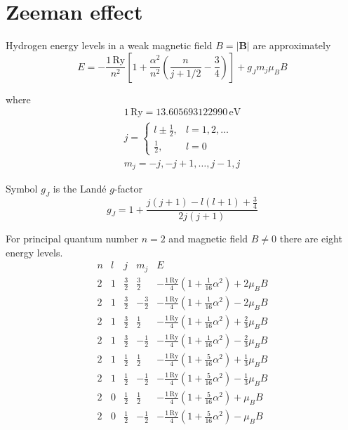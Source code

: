 

\section*{Zeeman effect}

Hydrogen energy levels in a weak magnetic field $B=|\mathbf B|$ are approximately
\begin{equation*}
E=-\frac{1\,\text{Ry}}{n^2}
\left[
1+\frac{\alpha^2}{n^2}\left(\frac{n}{j+1/2}-\frac{3}{4}\right)
\right]+g_Jm_j\mu_BB
\end{equation*}

where
\begin{gather*}
1\,\text{Ry}=13.605693122990\,\text{eV}
\\
j=\begin{cases}
l\pm\frac{1}{2}, & l=1,2,\ldots
\\
\frac{1}{2}, & l=0
\end{cases}
\\[1ex]
m_j=-j,-j+1,\ldots,j-1,j
\end{gather*}

Symbol $g_J$ is the Land\'e $g$-factor
\begin{equation*}
g_J=1+\frac{j(j+1)-l(l+1)+\frac{3}{4}}{2j(j+1)}
\end{equation*}

For principal quantum number $n=2$ and magnetic field $B\ne0$ there are eight energy levels.
\begin{equation*}
\begin{matrix}
n & l & j & m_j & E
\\[2ex]
2 & 1 & \frac{3}{2} & \frac{3}{2} &
-\frac{1\,\text{Ry}}{4}\left(1+\tfrac{1}{16}\alpha^2\right)+2\mu_BB
\\[2ex]
2 & 1 & \frac{3}{2} & -\frac{3}{2} &
-\frac{1\,\text{Ry}}{4}\left(1+\tfrac{1}{16}\alpha^2\right)-2\mu_BB
\\[2ex]
2 & 1 & \frac{3}{2} & \frac{1}{2} &
-\frac{1\,\text{Ry}}{4}\left(1+\tfrac{1}{16}\alpha^2\right)+\frac{2}{3}\mu_BB
\\[2ex]
2 & 1 & \frac{3}{2} & -\frac{1}{2} &
-\frac{1\,\text{Ry}}{4}\left(1+\tfrac{1}{16}\alpha^2\right)-\frac{2}{3}\mu_BB
\\[2ex]
2 & 1 & \frac{1}{2} & \frac{1}{2} &
-\frac{1\,\text{Ry}}{4}\left(1+\tfrac{5}{16}\alpha^2\right)+\frac{1}{3}\mu_BB
\\[2ex]
2 & 1 & \frac{1}{2} & -\frac{1}{2} &
-\frac{1\,\text{Ry}}{4}\left(1+\tfrac{5}{16}\alpha^2\right)-\frac{1}{3}\mu_BB
\\[2ex]
2 & 0 & \frac{1}{2} & \frac{1}{2} &
-\frac{1\,\text{Ry}}{4}\left(1+\tfrac{5}{16}\alpha^2\right)+\mu_BB
\\[2ex]
2 & 0 & \frac{1}{2} & -\frac{1}{2} &
-\frac{1\,\text{Ry}}{4}\left(1+\tfrac{5}{16}\alpha^2\right)-\mu_BB
\end{matrix}
\end{equation*}


